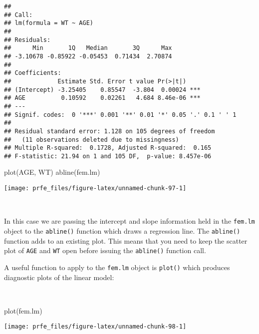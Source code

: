 \documentclass[
  12pt,
  a4paper]{book}
\newenvironment{Shaded}{\begin{snugshade}}{\end{snugshade}}
\newcommand{\FunctionTok}[1]{\textcolor[rgb]{0.00,0.00,0.00}{#1}}
\newcommand{\NormalTok}[1]{#1}
\begin{document}
\begin{verbatim}
## 
## Call:
## lm(formula = WT ~ AGE)
## 
## Residuals:
##      Min       1Q   Median       3Q      Max 
## -3.10678 -0.85922 -0.05453  0.71434  2.70874 
## 
## Coefficients:
##             Estimate Std. Error t value Pr(>|t|)    
## (Intercept) -3.25405    0.85547  -3.804  0.00024 ***
## AGE          0.10592    0.02261   4.684 8.46e-06 ***
## ---
## Signif. codes:  0 '***' 0.001 '**' 0.01 '*' 0.05 '.' 0.1 ' ' 1
## 
## Residual standard error: 1.128 on 105 degrees of freedom
##   (11 observations deleted due to missingness)
## Multiple R-squared:  0.1728, Adjusted R-squared:  0.165 
## F-statistic: 21.94 on 1 and 105 DF,  p-value: 8.457e-06
\end{verbatim}

\newpage

\begin{Shaded}
\begin{Highlighting}[]
\FunctionTok{plot}\NormalTok{(AGE, WT)}
\FunctionTok{abline}\NormalTok{(fem.lm)}
\end{Highlighting}
\end{Shaded}

\begin{center}\texttt{[image: prfe\_files/figure-latex/unnamed-chunk-97-1]} \end{center}

~

In this case we are passing the intercept and slope information held in the \texttt{fem.lm} object to the \texttt{abline()} function which draws a regression line. The \texttt{abline()} function adds to an existing plot. This means that you need to keep the scatter plot of \texttt{AGE} and \texttt{WT} open before issuing the \texttt{abline()} function call.

\newpage

A useful function to apply to the \texttt{fem.lm} object is \texttt{plot()} which produces diagnostic plots of the linear model:

~

\begin{Shaded}
\begin{Highlighting}[]
\FunctionTok{plot}\NormalTok{(fem.lm)}
\end{Highlighting}
\end{Shaded}

\begin{center}\texttt{[image: prfe\_files/figure-latex/unnamed-chunk-98-1]} \end{center}
\end{document}
